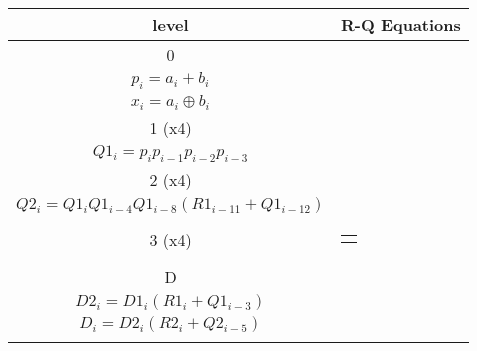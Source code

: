 \begin{table}[H]
\centering
     \begin{tabularx}{\textwidth}{|| c | X ||}
     
        \hline
        level & R-Q Equations\\
        \hline
        \hline
        
        0   & 
        \begin{tabular}{@{}c@{}}$g_i = a_i * b_i$\\$p_i = a_i + b_i$\\$x_i = a_i \oplus b_i $\end{tabular}\\\hline
        
        1 (x4)  & 
        \begin{tabular}{@{}c@{}}
        $R1_i = g_i + g_{i-1} + p_{i-1}g_{i-2} + p_{i-1}p_{i-2}g_{i-3}$\\
        $Q1_i = p_ip_{i-1}p_{i-2}p_{i-3}$
        \end{tabular}\\\hline
       
        2 (x4)  & 
        \begin{tabular}{@{}c@{}}
        $R2_i = R1_i + R1_{i-4} + Q1_{i-5}*R1_{i-8} + Q1_{i-5}*Q1_{i-9}*R1_{i-12}$\\
        $Q2_i = Q1_i Q1_{i-4} Q1_{i-8} ( R1_{i-11} + Q1_{i-12})$
        \end{tabular}\\\hline
        
        3 (x4)  & 
        \begin{tabular}{@{}c@{}}
        $R3_i = R2_i + R2_{i-16} + Q2_{i-21}*R2_{i-32} + Q2_{i-21}*Q2_{i-37}*R3_{i-48}$
        \end{tabular}\\\hline
        
        D   & 
        \begin{tabular}{@{}c@{}}$ D1_i = g_i + p_ig_{i-1} + p_ip_{i-1}p_{i-2}$\\
        $D2_i = D1_i ( R1_i + Q1_{i-3} )$\\
        $D_i = D2_i ( R2_i + Q2_{i-5} )$\\
        \end{tabular}\\\hline
        

\end{tabularx}
\end{table}
